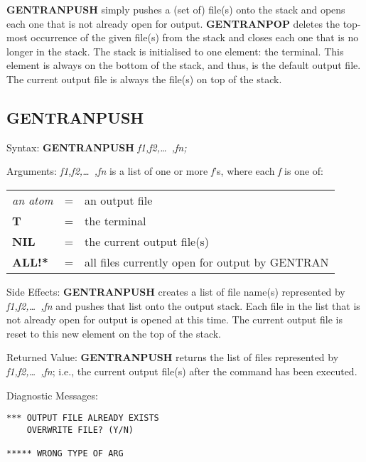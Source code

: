 {\bf GENTRANPUSH} simply pushes a (set of) file(s) onto
the stack and opens each one that is not already open for
output.  {\bf GENTRANPOP} deletes the top-most occurrence of
the given file(s) from the stack and closes each one that is no
longer in the stack.  The stack is initialised to one element:  the
terminal.  This element is always on the bottom of the stack, and thus,
is the default output file.  The current output file is always the
file(s) on top of the stack.

\subsection{GENTRANPUSH}
\begin{describe}{Syntax:}
{\bf GENTRANPUSH} {\it f1,f2,\dots\ ,fn;}
\end{describe}
\begin{describe}{Arguments:}
{\it f1,f2,\dots\ ,fn\/} is a list of one or more {\it f\/}'s, where each
{\it f\/} is one of:
\begin{center}
\begin{tabular}{lll}
{\it an atom} & = & an output file\\
{\bf T} & = & the terminal\\
{\bf NIL} & = & the current output file(s)\\
{\bf ALL!*} & = & all files currently open for output by GENTRAN\\
\end{tabular}
\end{center}
\end{describe}
\begin{describe}{Side Effects:}
{\bf GENTRANPUSH} creates a list of file name(s) represented by
{\it f1,f2,\dots\ ,fn\/} and pushes that list onto the output stack.  Each file
in the list that is not already open for output is opened at this time.  The
current output file is reset to this new element on the top of the stack.
\end{describe}
\begin{describe}{Returned Value:}
{\bf GENTRANPUSH} returns the list of files represented by 
{\it f1,f2,\dots\ ,fn\/};
i.e., the current output file(s) after the command has been executed.
\end{describe}
\begin{describe}{Diagnostic Messages:}
\begin{verbatim}
*** OUTPUT FILE ALREADY EXISTS
    OVERWRITE FILE? (Y/N)

***** WRONG TYPE OF ARG
\end{verbatim}
\end{describe}
